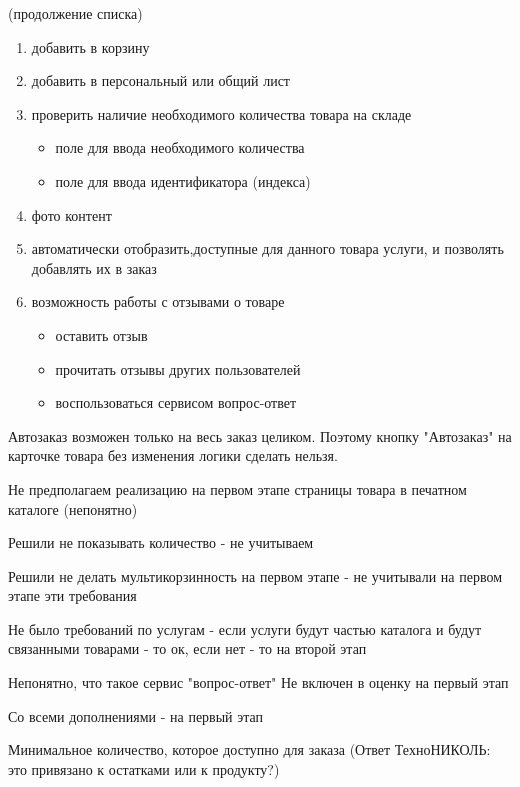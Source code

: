 {\begin{wikilong}
	(продолжение списка)
	\begin{enumerate}
		\item добавить в корзину
		\item добавить в персональный или общий лист
		\item проверить наличие необходимого количества товара на складе
				\begin{itemize}
					\item   поле для ввода необходимого количества
					\item   поле для ввода идентификатора (индекса)
				\end{itemize}
		\item фото контент 
		\item  автоматически отобразить,доступные для данного товара услуги, и позволять добавлять их в заказ 
		\item  возможность работы с отзывами о товаре
				\begin{itemize}
					\item оставить отзыв
					\item прочитать отзывы других пользователей
					\item воспользоваться сервисом вопрос-ответ
				\end{itemize}
	\end{enumerate}
\end{wikilong}

\begin{teamidea}
Автозаказ возможен только на весь заказ целиком. Поэтому кнопку "Автозаказ" на карточке товара без изменения логики сделать нельзя.

Не предполагаем реализацию на первом этапе страницы товара в печатном каталоге (непонятно)

Решили не показывать количество - не учитываем

Решили не делать мультикорзинность на первом этапе - не учитывали на первом этапе эти требования

Не было требований по услугам - если услуги будут частью каталога и будут связанными товарами - то ок, если нет - то на второй этап

Непонятно, что такое сервис "вопрос-ответ" Не включен в оценку на первый этап

Со всеми дополнениями - на первый этап
\end{teamidea}

\begin{hybris}
Минимальное количество, которое доступно для заказа (Ответ ТехноНИКОЛЬ: это привязано к остатками или к продукту?)


\end{hybris}}

